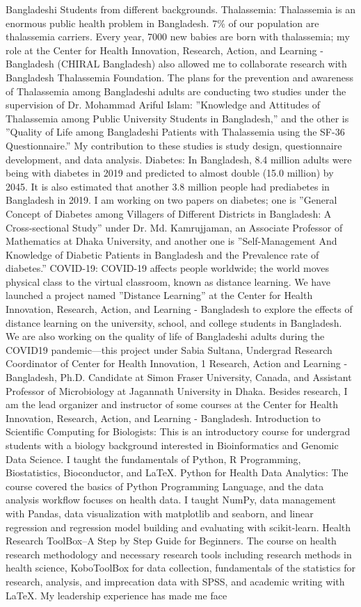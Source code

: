 \documentclass{article}
\begin{document}
Bangladeshi Students from different backgrounds. Thalassemia: Thalassemia is an enormous public health problem in Bangladesh. 7\% of our population are thalassemia carriers. Every year, 7000 new babies are born with thalassemia; my role at the Center for Health Innovation, Research, Action, and Learning -Bangladesh (CHIRAL Bangladesh) also allowed me to collaborate research with Bangladesh Thalassemia Foundation. The plans for the prevention and awareness of Thalassemia among Bangladeshi adults are conducting two studies under the supervision of Dr. Mohammad Ariful Islam: ”Knowledge and Attitudes of Thalassemia among Public University Students in Bangladesh,” and the other is ”Quality of Life among Bangladeshi Patients with Thalassemia using the SF-36 Questionnaire.” My contribution to these studies is study design, questionnaire development, and data analysis. Diabetes: In Bangladesh, 8.4 million adults were being with diabetes in 2019 and predicted to almost double (15.0 million) by 2045. It is also estimated that another 3.8 million people had prediabetes in Bangladesh in 2019. I am working on two papers on diabetes; one is ”General Concept of Diabetes among Villagers of Different Districts in Bangladesh: A Cross-sectional Study” under Dr. Md. Kamrujjaman, an Associate Professor of Mathematics at Dhaka University, and another one is ”Self-Management And Knowledge of Diabetic Patients in Bangladesh and the Prevalence rate of diabetes.” COVID-19: COVID-19 affects people worldwide; the world moves physical class to the virtual classroom, known as distance learning. We have launched a project named ”Distance Learning” at the Center for Health Innovation, Research, Action, and Learning - Bangladesh to explore the effects of distance learning on the university, school, and college students in Bangladesh. We are also working on the quality of life of Bangladeshi adults during the COVID19 pandemic—this project under Sabia Sultana, Undergrad Research Coordinator of Center for Health Innovation, 1 Research, Action and Learning - Bangladesh, Ph.D. Candidate at Simon Fraser University, Canada, and Assistant Professor of Microbiology at Jagannath University in Dhaka. Besides research, I am the lead organizer and instructor of some courses at the Center for Health Innovation, Research, Action, and Learning - Bangladesh. Introduction to Scientific Computing for Biologists: This is an introductory course for undergrad students with a biology background interested in Bioinformatics and Genomic Data Science. I taught the fundamentals of Python, R Programming, Biostatistics, Bioconductor, and LaTeX. Python for Health Data Analytics: The course covered the basics of Python Programming Language, and the data analysis workflow focuses on health data. I taught NumPy, data management with Pandas, data visualization with matplotlib and seaborn, and linear regression and regression model building and evaluating with scikit-learn. Health Research ToolBox–A Step by Step Guide for Beginners. The course on health research methodology and necessary research tools including research methods in health science, KoboToolBox for data collection, fundamentals of the statistics for research, analysis, and imprecation data with SPSS, and academic writing with LaTeX. My leadership experience has made me face 
\end{document}
